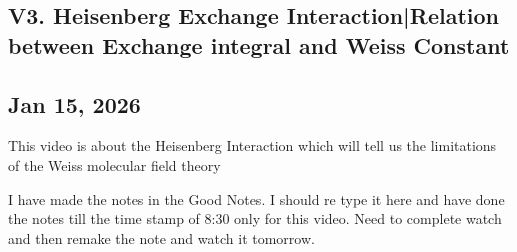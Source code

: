 \subsection*{V3. Heisenberg Exchange Interaction|Relation between Exchange integral and Weiss Constant}
\label{chap:Magnetism/Heisenberg_Exchange}

\subsection*{Jan 15, 2026}
This video is about the Heisenberg Interaction which will tell us the limitations of the Weiss molecular field theory

I have made the notes in the Good Notes. I should re type it here and have done the notes till the time stamp of 8:30 only for this video. Need to complete watch and then remake the note and watch it tomorrow.

